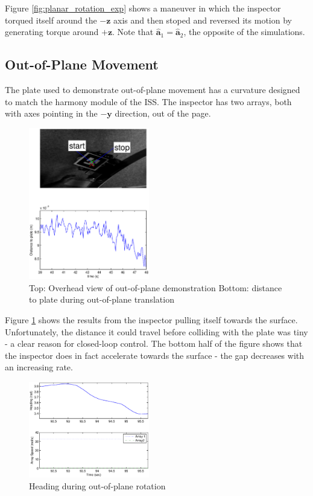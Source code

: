 \documentclass[letterpaper, 10 pt, conference]{ieeeconf}  %
\begin{document}
  \par Figure \ref{fig:planar_rotation_exp} shows a maneuver in which the inspector torqued itself around the $-\textbf{z}$ axis and then stoped and reversed its motion by generating torque around $+\textbf{z}$.  Note that $\hat{\textbf{a}}_1 =  \hat{\textbf{a}}_2$, the opposite of the simulations.

     \subsection{Out-of-Plane Movement}\label{sec:oop_movement_exp}
     
     The plate used to demonstrate out-of-plane movement has a curvature designed to match the harmony module of the ISS. The inspector has two arrays, both with axes pointing in the $-\textbf{y}$ direction, out of the page.  
         \begin{figure}[thpb]
      \centering
      \includegraphics[width = 0.47\textwidth]{figures/oop_translation.eps}
      \caption{Top: Overhead view of out-of-plane demonstration Bottom: distance to plate during out-of-plane translation}
      \label{fig:oop_translation_exp}
   \end{figure}
   
   \par Figure \ref{fig:oop_translation_exp} shows the results from the inspector pulling itself towards the surface. Unfortunately, the distance it could travel before colliding with the plate was tiny - a clear reason for closed-loop control. The bottom half of the figure shows that the inspector does in fact accelerate towards the surface - the gap decreases with an increasing rate. 
  
      
         \begin{figure}[thpb]
      \centering
      \includegraphics[width = 0.47\textwidth]{figures/oop_rotation.eps}
      \caption{Heading during out-of-plane rotation}
      \label{fig:oop_rotation_exp}
   \end{figure}
   
\end{document}
